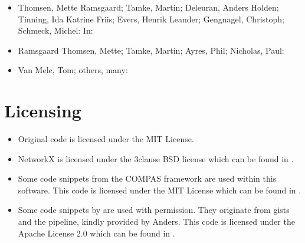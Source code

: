 \documentclass[letterpaper,10pt,english]{sphinxmanual}
\begin{document}
\begin{itemize}
\item {} 
Thomsen, Mette Ramsgaard; Tamke, Martin; Deleuran, Anders Holden;
Tinning, Ida Katrine Friis; Evers, Henrik Leander; Gengnagel,
Christoph; Schmeck, Michel:  In: 

\item {} 
Ramsgaard Thomsen, Mette; Tamke, Martin; Ayres, Phil; Nicholas, Paul:

\item {} 
Van Mele, Tom; others, many: 

\end{itemize}


\section{Licensing}
\label{\detokenize{README:licensing}}\begin{itemize}
\item {} 
Original code is licensed under the MIT License.

\item {} 
NetworkX is licensed under the 3\sphinxhyphen{}clause BSD license which can be
found in .

\item {} 
Some code snippets from the COMPAS framework are used within this
software. This code is licensed under the MIT License which can be
found in .

\item {} 
Some code snippets by  are used with
permission. They originate from gists and the  pipeline, kindly
provided by Anders. This code is licensed under the Apache License
2.0 which can be found in .

\end{itemize}
\end{document}
